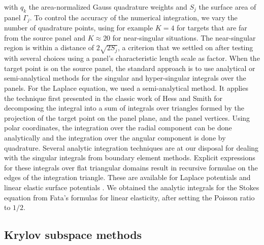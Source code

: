 \documentclass[final,3p,times]{elsarticle}
\begin{document}
\noindent
with $q_k$ the area-normalized Gauss quadrature weights and $S_j$ the surface area of panel $\Gamma_j$. To control the accuracy of the numerical integration, we vary the number of quadrature points, using for example $K= 4$ for targets that are far from the source panel and $K\approx 20$ for near-singular situations. 
The near-singular region is within a distance of $2\sqrt{2 S_j}$, a criterion that we settled on after  testing with several choices using a panel's characteristic length scale as factor.
When the target point is on the source panel, the standard approach is to use analytical or semi-analytical methods for the singular and hyper-singular integrals over the panels.
For the Laplace equation, we used a semi-analytical method. 
It applies the technique first presented in the classic work of Hess and Smith \cite[p.~49, ff.]{HessSmith1967} for decomposing the integral into a sum of integrals over triangles formed by the projection of the target point on the panel plane, and the panel vertices. Using polar coordinates, the integration over the radial component can be done analytically and the integration over the angular component is done by quadrature. %
Several analytic integration techniques are at our disposal for dealing with the singular integrals from boundary element methods. Explicit expressions for these integrals over flat triangular domains result in recursive formulae on the edges of the integration triangle. These are available for Laplace potentials \cite{Fata2009} and linear elastic surface potentials \cite{Fata2011}. 
We obtained the analytic integrals for the Stokes equation from Fata's formulas for linear elasticity, after setting the Poisson ratio to $1/2$. 

\subsection{Krylov subspace methods}
\end{document}
